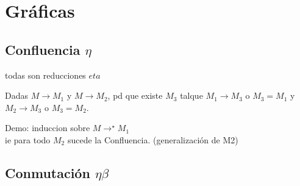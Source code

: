 \chapter{Gráficas}

\section{Confluencia $\eta$}
todas son reducciones $eta$


Dadas $ M \to M_1$ y  $ M \to M_2$, pd que existe $M_3$ talque
$ M_1 \to M_3$ o $M_3=M_1$ y $ M_2 \to M_3$ o $M_3 = M_2$.

Demo: induccion sobre $ M \to^\star M_1$ \\
ie para todo $M_2$ sucede la Confluencia. (generalizaci\'on de M2)


\newpage

\section{Conmutación $\eta \beta$}


